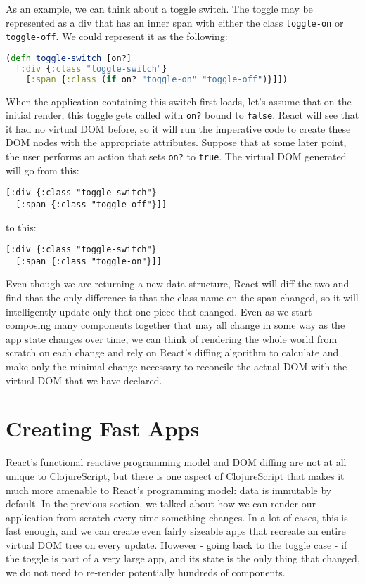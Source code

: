 \documentclass[10pt,twoside,openright]{memoir}
\begin{document}
As an example, we can think about a toggle switch. The toggle may be
represented as a div that has an inner span with either the class
\texttt{toggle-on} or \texttt{toggle-off}. We could represent it as the
following:

\begin{lstlisting}[language=Clojure]
(defn toggle-switch [on?]
  [:div {:class "toggle-switch"}
    [:span {:class (if on? "toggle-on" "toggle-off")}]])
\end{lstlisting}

When the application containing this switch first loads, let's assume
that on the initial render, this toggle gets called with \texttt{on?}
bound to \texttt{false}. React will see that it had no virtual DOM
before, so it will run the imperative code to create these DOM nodes
with the appropriate attributes. Suppose that at some later point, the
user performs an action that sets \texttt{on?} to \texttt{true}. The
virtual DOM generated will go from this:

\begin{verbatim}
[:div {:class "toggle-switch"}
  [:span {:class "toggle-off"}]]
\end{verbatim}

to this:

\begin{verbatim}
[:div {:class "toggle-switch"}
  [:span {:class "toggle-on"}]]
\end{verbatim}

Even though we are returning a new data structure, React will diff the
two and find that the only difference is that the class name on the span
changed, so it will intelligently update only that one piece that
changed. Even as we start composing many components together that may
all change in some way as the app state changes over time, we can think
of rendering the whole world from scratch on each change and rely on
React's diffing algorithm to calculate and make only the minimal change
necessary to reconcile the actual DOM with the virtual DOM that we have
declared.


\section{Creating Fast Apps}

React's functional reactive programming model and DOM diffing are not at
all unique to ClojureScript, but there is one aspect of ClojureScript
that makes it much more amenable to React's programming model: data is
immutable by default. In the previous section, we talked about how we
can render our application from scratch every time something changes. In
a lot of cases, this is fast enough, and we can create even fairly
sizeable apps that recreate an entire virtual DOM tree on every update.
However - going back to the toggle case - if the toggle is part of a
very large app, and its state is the only thing that changed, we do not
need to re-render potentially hundreds of components.
\end{document}
